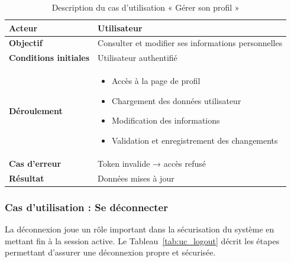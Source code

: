 \begin{table}[H]
\centering
\renewcommand{\arraystretch}{1.2}
\begin{tabular}{|p{4cm}|p{10cm}|}
\hline
\textbf{Acteur} & Utilisateur \\ \hline

\textbf{Objectif} & Consulter et modifier ses informations personnelles \\ \hline

\textbf{Conditions initiales} & Utilisateur authentifié \\ \hline

\textbf{Déroulement} & 
\begin{itemize}
    \item Accès à la page de profil
    \item Chargement des données utilisateur
    \item Modification des informations
    \item Validation et enregistrement des changements
\end{itemize} \\ \hline

\textbf{Cas d’erreur} & Token invalide → accès refusé \\ \hline

\textbf{Résultat} & Données mises à jour \\ \hline
\end{tabular}
\caption{Description du cas d’utilisation « Gérer son profil »}
\label{tab:uc_profile}
\end{table}

\subsubsection{Cas d’utilisation : Se déconnecter}

La déconnexion joue un rôle important dans la sécurisation du système en mettant fin à la session active. Le Tableau~\ref{tab:uc_logout} décrit les étapes permettant d’assurer une déconnexion propre et sécurisée.

